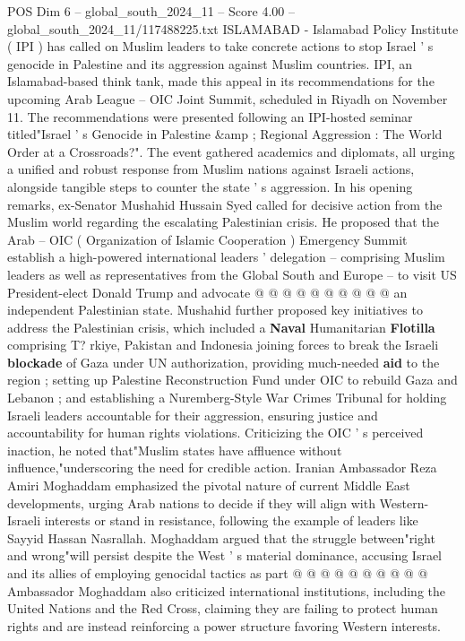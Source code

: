 \begin{textsample}{POS Dim 6 – global\_south\_2024\_11 – Score 4.00 – global\_south\_2024\_11/117488225.txt}  \label{ex:f6_pos_336}
ISLAMABAD - Islamabad Policy Institute ( IPI ) has called on Muslim leaders to take concrete actions to stop Israel ' s genocide in Palestine and its aggression against Muslim countries.
IPI, an Islamabad-based think tank, made this appeal in its recommendations for the upcoming Arab League -- OIC Joint Summit, scheduled in Riyadh on November 11.
The recommendations were presented following an IPI-hosted seminar titled"Israel ' s Genocide in Palestine \&amp ; Regional Aggression : The World Order at a Crossroads?".
The event gathered academics and diplomats, all urging a unified and robust response from Muslim nations against Israeli actions, alongside tangible steps to counter the state ' s aggression.
In his opening remarks, ex-Senator Mushahid Hussain Syed called for decisive action from the Muslim world regarding the escalating Palestinian crisis.
He proposed that the Arab -- OIC ( Organization of Islamic Cooperation ) Emergency Summit establish a high-powered international leaders ' delegation -- comprising Muslim leaders as well as representatives from the Global South and Europe -- to visit US President-elect Donald Trump and advocate @ @ @ @ @ @ @ @ @ @ an independent Palestinian state.
Mushahid further proposed key initiatives to address the Palestinian crisis, which included a \textbf{Naval} Humanitarian \textbf{Flotilla} comprising T? rkiye, Pakistan and Indonesia joining forces to break the Israeli \textbf{blockade} of Gaza under UN authorization, providing much-needed \textbf{aid} to the region ; setting up Palestine Reconstruction Fund under OIC to rebuild Gaza and Lebanon ; and establishing a Nuremberg-Style War Crimes Tribunal for holding Israeli leaders accountable for their aggression, ensuring justice and accountability for human rights violations.
Criticizing the OIC ' s perceived inaction, he noted that"Muslim states have affluence without influence,"underscoring the need for credible action.
Iranian Ambassador Reza Amiri Moghaddam emphasized the pivotal nature of current Middle East developments, urging Arab nations to decide if they will align with Western-Israeli interests or stand in resistance, following the example of leaders like Sayyid Hassan Nasrallah.
Moghaddam argued that the struggle between"right and wrong"will persist despite the West ' s material dominance, accusing Israel and its allies of employing genocidal tactics as part @ @ @ @ @ @ @ @ @ @ Ambassador Moghaddam also criticized international institutions, including the United Nations and the Red Cross, claiming they are failing to protect human rights and are instead reinforcing a power structure favoring Western interests.

\end{textsample}
